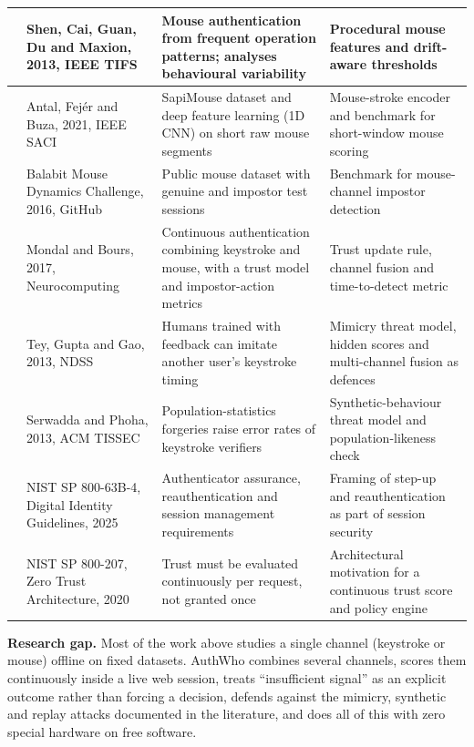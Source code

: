 \documentclass[10pt,letterpaper]{article}
\begin{document}
\begin{xltabular}{\textwidth}{P{0.6cm} P{4.2cm} L L}
\cite{shen2013} & Shen, Cai, Guan, Du and Maxion, 2013, IEEE TIFS & Mouse authentication from frequent operation patterns; analyses behavioural variability & Procedural mouse features and drift-aware thresholds \\ \hline
\cite{antal2021} & Antal, Fej\'er and Buza, 2021, IEEE SACI & SapiMouse dataset and deep feature learning (1D CNN) on short raw mouse segments & Mouse-stroke encoder and benchmark for short-window mouse scoring \\ \hline
\cite{balabit2016} & Balabit Mouse Dynamics Challenge, 2016, GitHub & Public mouse dataset with genuine and impostor test sessions & Benchmark for mouse-channel impostor detection \\ \hline
\cite{mondal2017} & Mondal and Bours, 2017, Neurocomputing & Continuous authentication combining keystroke and mouse, with a trust model and impostor-action metrics & Trust update rule, channel fusion and time-to-detect metric \\ \hline
\cite{tey2013} & Tey, Gupta and Gao, 2013, NDSS & Humans trained with feedback can imitate another user's keystroke timing & Mimicry threat model, hidden scores and multi-channel fusion as defences \\ \hline
\cite{serwadda2013} & Serwadda and Phoha, 2013, ACM TISSEC & Population-statistics forgeries raise error rates of keystroke verifiers & Synthetic-behaviour threat model and population-likeness check \\ \hline
\cite{nist80063b} & NIST SP 800-63B-4, Digital Identity Guidelines, 2025 & Authenticator assurance, reauthentication and session management requirements & Framing of step-up and reauthentication as part of session security \\ \hline
\cite{nist800207} & NIST SP 800-207, Zero Trust Architecture, 2020 & Trust must be evaluated continuously per request, not granted once & Architectural motivation for a continuous trust score and policy engine \\
\end{xltabular}

\textbf{Research gap.} Most of the work above studies a single channel (keystroke or mouse) offline on fixed datasets. AuthWho combines several channels, scores them continuously inside a live web session, treats ``insufficient signal'' as an explicit outcome rather than forcing a decision, defends against the mimicry, synthetic and replay attacks documented in the literature, and does all of this with zero special hardware on free software.
\end{document}
